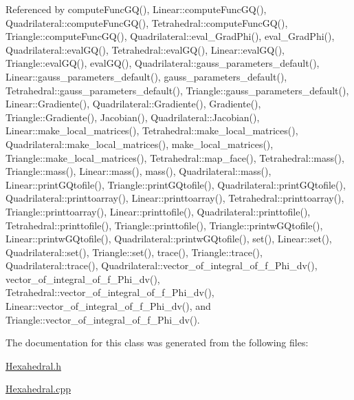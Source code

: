 Referenced by compute\+Func\+G\+Q(), Linear\+::compute\+Func\+G\+Q(), Quadrilateral\+::compute\+Func\+G\+Q(), Tetrahedral\+::compute\+Func\+G\+Q(), Triangle\+::compute\+Func\+G\+Q(), Quadrilateral\+::eval\+\_\+\+Grad\+Phi(), eval\+\_\+\+Grad\+Phi(), Quadrilateral\+::eval\+G\+Q(), Tetrahedral\+::eval\+G\+Q(), Linear\+::eval\+G\+Q(), Triangle\+::eval\+G\+Q(), eval\+G\+Q(), Quadrilateral\+::gauss\+\_\+parameters\+\_\+default(), Linear\+::gauss\+\_\+parameters\+\_\+default(), gauss\+\_\+parameters\+\_\+default(), Tetrahedral\+::gauss\+\_\+parameters\+\_\+default(), Triangle\+::gauss\+\_\+parameters\+\_\+default(), Linear\+::\+Gradiente(), Quadrilateral\+::\+Gradiente(), Gradiente(), Triangle\+::\+Gradiente(), Jacobian(), Quadrilateral\+::\+Jacobian(), Linear\+::make\+\_\+local\+\_\+matrices(), Tetrahedral\+::make\+\_\+local\+\_\+matrices(), Quadrilateral\+::make\+\_\+local\+\_\+matrices(), make\+\_\+local\+\_\+matrices(), Triangle\+::make\+\_\+local\+\_\+matrices(), Tetrahedral\+::map\+\_\+face(), Tetrahedral\+::mass(), Triangle\+::mass(), Linear\+::mass(), mass(), Quadrilateral\+::mass(), Linear\+::print\+G\+Qtofile(), Triangle\+::print\+G\+Qtofile(), Quadrilateral\+::print\+G\+Qtofile(), Quadrilateral\+::printtoarray(), Linear\+::printtoarray(), Tetrahedral\+::printtoarray(), Triangle\+::printtoarray(), Linear\+::printtofile(), Quadrilateral\+::printtofile(), Tetrahedral\+::printtofile(), Triangle\+::printtofile(), Triangle\+::printw\+G\+Qtofile(), Linear\+::printw\+G\+Qtofile(), Quadrilateral\+::printw\+G\+Qtofile(), set(), Linear\+::set(), Quadrilateral\+::set(), Triangle\+::set(), trace(), Triangle\+::trace(), Quadrilateral\+::trace(), Quadrilateral\+::vector\+\_\+of\+\_\+integral\+\_\+of\+\_\+f\+\_\+\+Phi\+\_\+dv(), vector\+\_\+of\+\_\+integral\+\_\+of\+\_\+f\+\_\+\+Phi\+\_\+dv(), Tetrahedral\+::vector\+\_\+of\+\_\+integral\+\_\+of\+\_\+f\+\_\+\+Phi\+\_\+dv(), Linear\+::vector\+\_\+of\+\_\+integral\+\_\+of\+\_\+f\+\_\+\+Phi\+\_\+dv(), and Triangle\+::vector\+\_\+of\+\_\+integral\+\_\+of\+\_\+f\+\_\+\+Phi\+\_\+dv().



The documentation for this class was generated from the following files\+:\begin{DoxyCompactItemize}
\item 
\hyperlink{Hexahedral_8h}{Hexahedral.\+h}\item 
\hyperlink{Hexahedral_8cpp}{Hexahedral.\+cpp}\end{DoxyCompactItemize}
